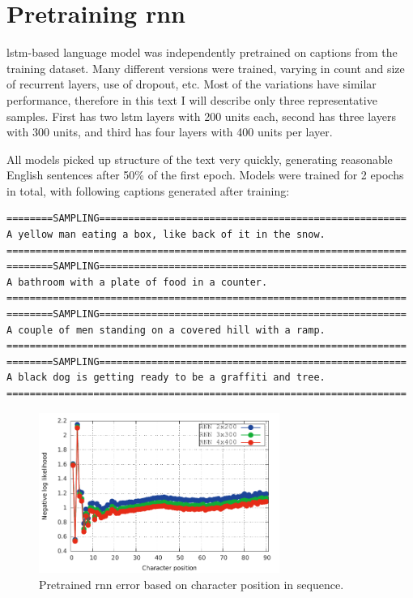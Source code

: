 \section{Pretraining \gls{rnn}} \label{sec:expretrain}

\gls{lstm}-based language model was independently pretrained on captions from the training dataset. Many different versions were trained, varying in count and size of recurrent layers, use of dropout, etc. Most of the variations have similar performance, therefore in this text I will describe only three representative samples. First has two \gls{lstm} layers with 200 units each, second has three layers with 300 units, and third has four layers with 400 units per layer.

All models picked up structure of the text very quickly, generating reasonable English sentences after 50\% of the first epoch. Models were trained for 2 epochs in total, with following captions generated after training:
\vspace{7mm}
\begin{lstlisting}
========SAMPLING=====================================================
A yellow man eating a box, like back of it in the snow.
=====================================================================
========SAMPLING=====================================================
A bathroom with a plate of food in a counter.
=====================================================================
========SAMPLING=====================================================
A couple of men standing on a covered hill with a ramp.
=====================================================================
========SAMPLING=====================================================
A black dog is getting ready to be a graffiti and tree.
=====================================================================
\end{lstlisting}
\vspace{7mm}

\begin{figure}[!t]
	\centering
	\includegraphics[width=0.7\textwidth]{fig/error_pretraining.pdf}
	\caption{Pretrained \gls{rnn} error based on character position in sequence.
		\label{fig:error_pretrain}}
\end{figure}

